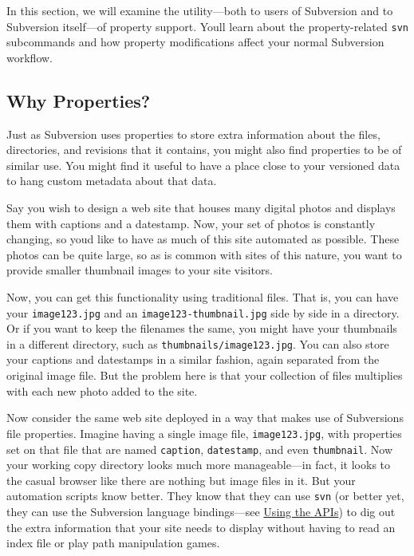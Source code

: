 In this section, we will examine the utility---both to users of
Subversion and to Subversion itself---of property support.
You\textquotesingle ll learn about the property-related \texttt{svn}
subcommands and how property modifications affect your normal Subversion
workflow.

\subsection{Why Properties?}\label{svn.advanced.props.why}

Just as Subversion uses properties to store extra information about the
files, directories, and revisions that it contains, you might also find
properties to be of similar use. You might find it useful to have a
place close to your versioned data to hang custom metadata about that
data.

Say you wish to design a web site that houses many digital photos and
displays them with captions and a datestamp. Now, your set of photos is
constantly changing, so you\textquotesingle d like to have as much of
this site automated as possible. These photos can be quite large, so as
is common with sites of this nature, you want to provide smaller
thumbnail images to your site visitors.

Now, you can get this functionality using traditional files. That is,
you can have your \texttt{image123.jpg} and an
\texttt{image123-thumbnail.jpg} side by side in a directory. Or if you
want to keep the filenames the same, you might have your thumbnails in a
different directory, such as \texttt{thumbnails/image123.jpg}. You can
also store your captions and datestamps in a similar fashion, again
separated from the original image file. But the problem here is that
your collection of files multiplies with each new photo added to the
site.

Now consider the same web site deployed in a way that makes use of
Subversion\textquotesingle s file properties. Imagine having a single
image file, \texttt{image123.jpg}, with properties set on that file that
are named \texttt{caption}, \texttt{datestamp}, and even
\texttt{thumbnail}. Now your working copy directory looks much more
manageable---in fact, it looks to the casual browser like there are
nothing but image files in it. But your automation scripts know better.
They know that they can use \texttt{svn} (or better yet, they can use
the Subversion language bindings---see
\hyperref[svn.developer.usingapi]{Using the APIs}) to dig out the extra
information that your site needs to display without having to read an
index file or play path manipulation games.

